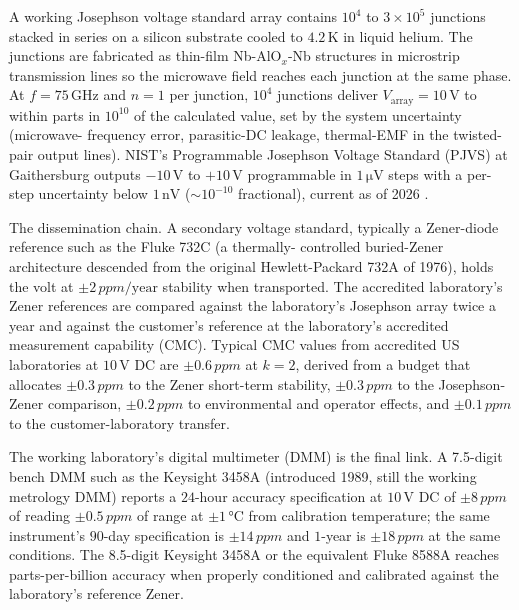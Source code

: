 A working Josephson voltage standard array contains $10^{4}$ to
$3 \times 10^{5}$ junctions stacked in series on a silicon
substrate cooled to $4.2\,\si{\kelvin}$ in liquid helium. The
junctions are fabricated as thin-film Nb-AlO$_{x}$-Nb structures
in microstrip transmission lines so the microwave field reaches
each junction at the same phase. At $f = 75\,\si{\giga\hertz}$
and $n = 1$ per junction, $10^{4}$ junctions deliver
$V_{\text{array}} = 10\,\si{\volt}$ to within parts in $10^{10}$
of the calculated value, set by the system uncertainty (microwave-
frequency error, parasitic-DC leakage, thermal-EMF in the
twisted-pair output lines). NIST's Programmable Josephson
Voltage Standard (PJVS) at Gaithersburg outputs $-10\,\si{\volt}$
to $+10\,\si{\volt}$ programmable in $1\,\si{\micro\volt}$ steps
with a per-step uncertainty below $1\,\si{\nano\volt}$ ($\sim
10^{-10}$ fractional), current as of 2026 \cite{web:nist-pjvs}.

The dissemination chain. A secondary voltage standard, typically
a Zener-diode reference such as the Fluke 732C (a thermally-
controlled buried-Zener architecture descended from the original
Hewlett-Packard 732A of 1976), holds the volt at $\pm 2\,\si{ppm}/
\text{year}$ stability when transported. The accredited laboratory's
Zener references are compared against the laboratory's Josephson
array twice a year and against the customer's reference at the
laboratory's accredited measurement capability (CMC). Typical CMC
values from accredited US laboratories at $10\,\si{\volt}$ DC are
$\pm 0.6\,\si{ppm}$ at $k = 2$, derived from a budget that allocates
$\pm 0.3\,\si{ppm}$ to the Zener short-term stability, $\pm 0.3\,
\si{ppm}$ to the Josephson-Zener comparison, $\pm 0.2\,\si{ppm}$
to environmental and operator effects, and $\pm 0.1\,\si{ppm}$ to
the customer-laboratory transfer.

The working laboratory's digital multimeter (DMM) is the final
link. A 7.5-digit bench DMM such as the Keysight 3458A (introduced
1989, still the working metrology DMM) reports a
$24$-hour accuracy specification at $10\,\si{\volt}$ DC of
$\pm 8\,\si{ppm}$ of reading $\pm 0.5\,\si{ppm}$ of range at
$\pm 1\,\si{\celsius}$ from calibration temperature; the same
instrument's $90$-day specification is $\pm 14\,\si{ppm}$ and
$1$-year is $\pm 18\,\si{ppm}$ at the same conditions. The
8.5-digit Keysight 3458A or the equivalent Fluke 8588A reaches
parts-per-billion accuracy when properly conditioned and
calibrated against the laboratory's reference Zener.

